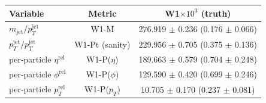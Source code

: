 \begin{ruledtabular}
  \begin{tabular}{lcc}
  \textbf{Variable} & \textbf{Metric} & \textbf{W1}$\times 10^3$ (truth) \\
  \hline
  $m_\mathrm{jet}/p_T^\mathrm{jet}$ & W1-M & 276.919 $\pm$ 0.236 (0.176 $\pm$ 0.066) \\
  $p_T^\mathrm{jet}/p_T^\mathrm{jet}$ & W1-Pt (sanity) & 229.956 $\pm$ 0.705 (0.375 $\pm$ 0.136) \\
  per-particle $\eta^\mathrm{rel}$ & W1-P($\eta$) & 189.663 $\pm$ 0.579 (0.704 $\pm$ 0.248) \\
  per-particle $\phi^\mathrm{rel}$ & W1-P($\phi$) & 129.590 $\pm$ 0.420 (0.699 $\pm$ 0.246) \\
  per-particle $p_T^\mathrm{rel}$ & W1-P($p_T$) & 10.705 $\pm$ 0.170 (0.237 $\pm$ 0.081) \\
  \end{tabular}
\end{ruledtabular}
